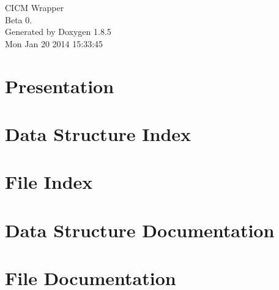 \documentclass[twoside]{book}
\newcommand{\clearemptydoublepage}{%
  \newpage{\pagestyle{empty}\cleardoublepage}%
}
\begin{document}
\hypersetup{pageanchor=false}
\begin{titlepage}
\vspace*{7cm}
\begin{center}%
{\Large C\-I\-C\-M Wrapper \\[1ex]\large Beta 0. }\\
\vspace*{1cm}
{\large Generated by Doxygen 1.8.5}\\
\vspace*{0.5cm}
{\small Mon Jan 20 2014 15:33:45}\\
\end{center}
\end{titlepage}
\clearemptydoublepage
\tableofcontents
\clearemptydoublepage
{}
\hypersetup{pageanchor=true}

\chapter{Presentation}
\label{index}\hypertarget{index}{}
\chapter{Data Structure Index}

\chapter{File Index}

\chapter{Data Structure Documentation}






















































\chapter{File Documentation}






\newpage
{}
{}
\printindex
\end{document}
